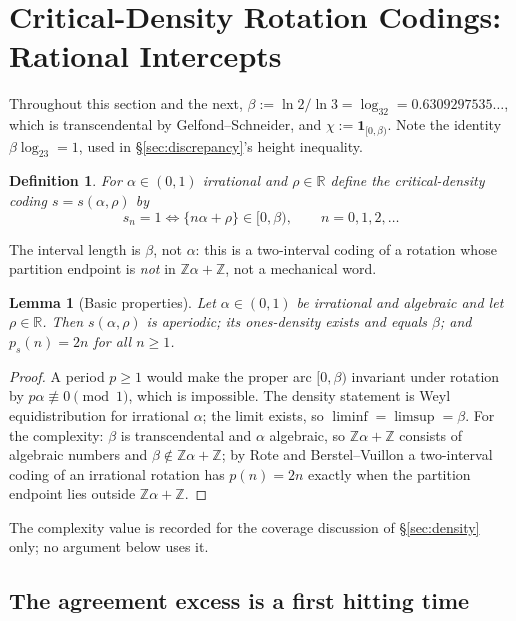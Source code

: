 \documentclass[11pt]{article}
\newtheorem{lemma}[theorem]{Lemma}
\newtheorem*{definition}{Definition}
\newcommand{\Z}{\mathbb{Z}}
\newcommand{\R}{\mathbb{R}}
\begin{document}
\section{Critical-Density Rotation Codings: Rational Intercepts}
\label{sec:ratint}

Throughout this section and the next, $\beta:=\ln2/\ln3=\log_32=0.6309297535\ldots$, which is
transcendental by Gelfond--Schneider, and $\chi:=\mathbf 1_{[0,\beta)}$. Note the identity
$\beta\log_23=1$, used in \S\ref{sec:discrepancy}'s height inequality.

\begin{definition}
For $\alpha\in(0,1)$ irrational and $\rho\in\R$ define the \emph{critical-density coding}
$s=s(\alpha,\rho)$ by
\[
  s_n=1\iff \{n\alpha+\rho\}\in[0,\beta),\qquad n=0,1,2,\ldots
\]
\end{definition}

The interval length is $\beta$, not $\alpha$: this is a two-interval coding of a rotation whose
partition endpoint is \emph{not} in $\Z\alpha+\Z$, not a mechanical word.

\begin{lemma}[Basic properties]
\label{lem:basic}
Let $\alpha\in(0,1)$ be irrational and algebraic and let $\rho\in\R$. Then $s(\alpha,\rho)$ is
aperiodic; its ones-density exists and equals $\beta$; and $p_s(n)=2n$ for all $n\ge1$.
\end{lemma}

\begin{proof}
A period $p\ge1$ would make the proper arc $[0,\beta)$ invariant under rotation by
$p\alpha\not\equiv0\pmod 1$, which is impossible. The density statement is Weyl equidistribution for
irrational $\alpha$; the limit exists, so $\liminf=\limsup=\beta$. For the complexity: $\beta$ is
transcendental and $\alpha$ algebraic, so $\Z\alpha+\Z$ consists of algebraic numbers and
$\beta\notin\Z\alpha+\Z$; by Rote \cite{Rote1994} and Berstel--Vuillon \cite{BerstelVuillon2001} a
two-interval coding of an irrational rotation has $p(n)=2n$ exactly when the partition endpoint lies
outside $\Z\alpha+\Z$.
\end{proof}

The complexity value is recorded for the coverage discussion of \S\ref{sec:density} only; no
argument below uses it.

\subsection{The agreement excess is a first hitting time}
\end{document}
